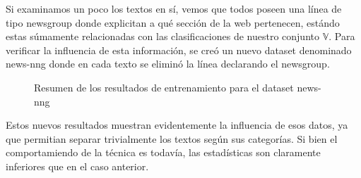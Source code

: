 \documentclass[a4paper,10pt]{article}
\begin{document}
Si examinamos un poco los textos en sí, vemos que todos poseen una línea de tipo \textsf{newsgroup} donde explicitan a qué sección de la web pertenecen, estándo estas súmamente relacionadas con las clasificaciones de nuestro conjunto $\mathbb{V}$. Para verificar la influencia de esta información, se creó un nuevo dataset denominado \textsf{news-nng} donde en cada texto se eliminó la línea declarando el newsgroup.

\vspace{5pt}

\begin{multicols}{2}

\begin{figure}[H]
\centering

\caption{Resumen de los resultados de entrenamiento para el dataset \textsf{news-nng}}
\end{figure}

Estos nuevos resultados muestran evidentemente la influencia de esos datos, ya que permitian separar trivialmente los textos según sus categorías. Si bien el comportamiendo de la técnica es todavía, las estadísticas son claramente inferiores que en el caso anterior.   
\end{multicols}
\end{document}

